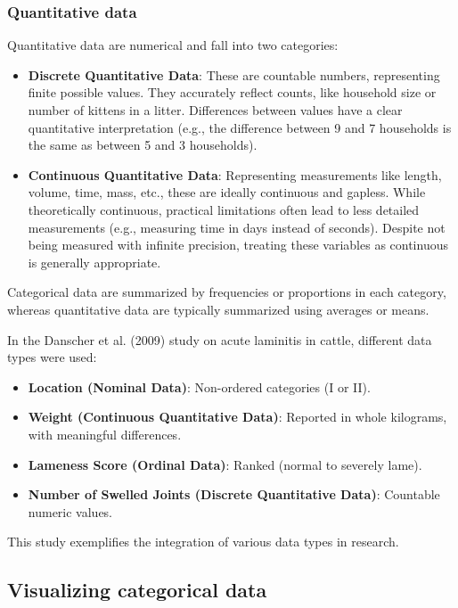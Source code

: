 \documentclass{article}
\begin{document}
\subsubsection{Quantitative data}

Quantitative data are numerical and fall into two categories:

\begin{itemize}
    \item \textbf{Discrete Quantitative Data}: These are countable numbers, representing finite possible values. They accurately reflect counts, like household size or number of kittens in a litter. Differences between values have a clear quantitative interpretation (e.g., the difference between 9 and 7 households is the same as between 5 and 3 households).
    \item \textbf{Continuous Quantitative Data}: Representing measurements like length, volume, time, mass, etc., these are ideally continuous and gapless. While theoretically continuous, practical limitations often lead to less detailed measurements (e.g., measuring time in days instead of seconds). Despite not being measured with infinite precision, treating these variables as continuous is generally appropriate.
\end{itemize}

Categorical data are summarized by frequencies or proportions in each category, whereas quantitative data are typically summarized using averages or means.

In the Danscher et al. (2009) study on acute laminitis in cattle, different data types were used:

\begin{itemize}
    \item \textbf{Location (Nominal Data)}: Non-ordered categories (I or II).
    \item \textbf{Weight (Continuous Quantitative Data)}: Reported in whole kilograms, with meaningful differences.
    \item \textbf{Lameness Score (Ordinal Data)}: Ranked (normal to severely lame).
    \item \textbf{Number of Swelled Joints (Discrete Quantitative Data)}: Countable numeric values.
\end{itemize}
This study exemplifies the integration of various data types in research.

\subsection{Visualizing categorical data}
\end{document}
